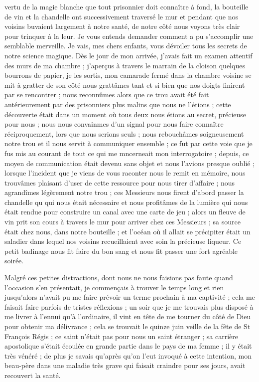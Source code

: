 \documentclass[11pt,a4paper]{report}
\begin{document}
vertu de la magie blanche que tout prisonnier doit connaître à fond, la bouteille de vin et la chandelle ont successivement traversé le mur et pendant que nos voisins buvaient largement à notre santé, de notre côté nous voyons très clair pour trinquer à la leur. Je vous entends demander comment a pu s'accomplir une semblable merveille. Je vais, mes chers enfants, vous dévoiler tous les secrets de notre science magique. Dès le jour de mon arrivée, j'avais fait un examen attentif des murs de ma chambre ; j'aperçus à travers le marrain de la cloison quelques bourrons de papier, je les sortis, mon camarade fermé dans la chambre voisine se mit à gratter de son côté nous grattâmes tant et si bien que nos doigts finirent par se rencontrer ; nous reconnûmes alors que ce trou avait été fait antérieurement par des prisonniers plus malins que nous ne l'étions ; cette découverte était dans un moment où tous deux nous étions au secret, précieuse pour nous ; nous nous convainmes d'un signal pour nous faire connaître réciproquement, lors que nous serions seuls ; nous rebouchâmes soigneusement notre trou et il nous servit à communiquer ensemble ; ce fut par cette voie que je fus mis au courant de tout ce qui me mncerneait mon interrogatoire ; depuis, ce moyen de communication était devenu sans objet et nous l'avions presque oublié ; lorsque l'incident que je viens de vous raconter nous le remit en mémoire, nous trouvâmes plaisant d'user de cette ressource pour nous tirer d'affaire ; nous agrandîmes légèrement notre trou ; ces Messieurs nous firent d'abord passer la chandelle qu qui nous était nécessaire et nous profitâmes de la lumière qui nous était rendue pour construire un canal avec une carte de jeu ; alors un fleuve de vin prit son cours à travers le mur pour arriver chez ces Messieurs ; sa source était chez nous, dans notre bouteille ; et l'océan où il allait se précipiter était un saladier dans lequel nos voisins recueillaient avec soin la précieuse liqueur. Ce petit badinage nous fit faire du bon sang et nous fit passer une fort agréable soirée.

Malgré ces petites distractions, dont nous ne nous faisions pas faute quand l'occasion s'en présentait, je commençais à trouver le temps long et rien jusqu'alors n'avait pu me faire prévoir un terme prochain à ma captivité ; cela me faisait faire parfois de tristes réflexions ; un soir que je me trouvais plus disposé à me livrer à l'ennui qu'à l'ordinaire, il vint en tête de me tourner du côté de Dieu pour obtenir ma délivrance ; cela se trouvait le quinze juin veille de la fête de St François Régis ; ce saint n'était pas pour nous un saint étranger ; sa carrière apostolique s'était écoulée en grande partie dans le pays de ma femme ; il y était très vénéré ; de plus je savais qu'après qu'on l'eut invoqué à cette intention, mon beau-père dans une maladie très grave qui faisait craindre pour ses jours, avait recouvert la santé.
\end{document}
